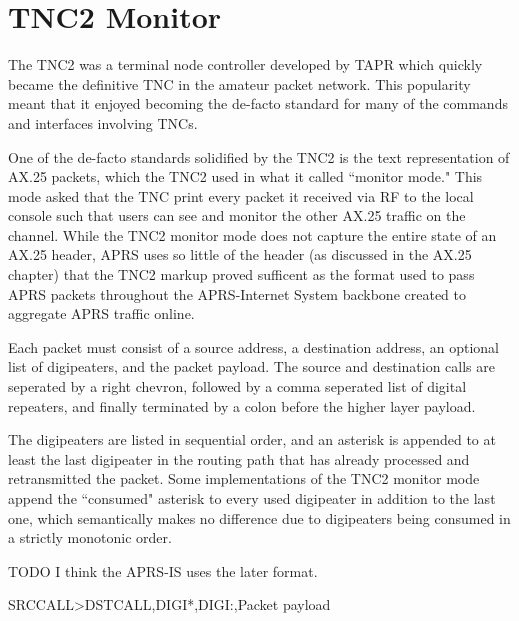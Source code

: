 \chapter{TNC2 Monitor}

The TNC2 was a terminal node controller developed by TAPR which
quickly became the definitive TNC in the amateur packet network.
This popularity meant that it enjoyed becoming the de-facto 
standard for many of the commands and interfaces involving 
TNCs.

One of the de-facto standards solidified by the TNC2 is the text
representation of AX.25 packets, which the TNC2 used in what it
called ``monitor mode." This mode asked that the TNC print 
every packet it received via RF to the local console such that
users can see and monitor the other AX.25 traffic on the channel.
While the TNC2 monitor mode does not capture the entire state of 
an AX.25 header, APRS uses so little of the header (as discussed in
the AX.25 chapter) that the TNC2 markup proved sufficent as the 
format used to pass APRS packets throughout the APRS-Internet System
backbone created to aggregate APRS traffic online.

Each packet must consist of a source address, a destination address,
an optional list of digipeaters, and the packet payload.
The source and destination calls are seperated by a right chevron,
followed by a comma seperated list of digital repeaters, and finally
terminated by a colon before the higher layer payload.

The digipeaters are listed in sequential order, and an asterisk
is appended to at least the last digipeater in the 
routing path that has already processed and retransmitted the packet.
Some implementations of the TNC2 monitor mode append the ``consumed"
asterisk to every used digipeater in addition to the last one,
which semantically makes no difference due to digipeaters
being consumed in a strictly monotonic order.

TODO I think the APRS-IS uses the later format.

SRCCALL>DSTCALL,DIGI*,DIGI:,Packet payload
